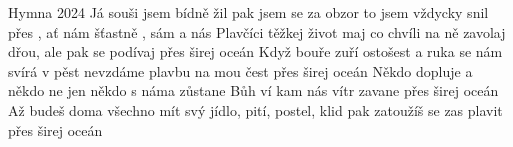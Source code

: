 \begin{TEXT}{Hymna 2024}
\SLOKA Já souši jsem bídně žil\NL
pak  jsem se \NL
za obzor to jsem vždycky snil\NL
přes 
\REFREN  {},  ať nám  šťastně \NL
{},  sám a  nás 
\SLOKA Plavčíci těžkej život maj\NL
co chvíli na ně zavolaj\NL
dřou, ale pak se podívaj \NL
přes širej oceán
\SLOKA Když bouře zuří ostošest\NL
a ruka se nám svírá v pěst\NL
nevzdáme plavbu na mou čest\NL
přes širej oceán
\SLOKA Někdo dopluje a někdo ne\NL
jen někdo s náma zůstane\NL
Bůh ví kam nás vítr zavane\NL
přes širej oceán
\SLOKA Až budeš doma všechno mít\NL
svý jídlo, pití, postel, klid\NL
pak zatoužíš se zas plavit\NL
přes širej oceán
\end{TEXT}
